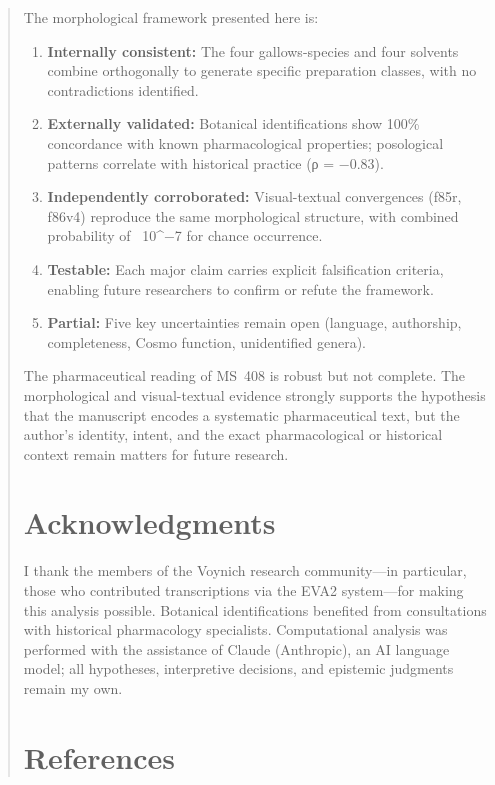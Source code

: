 \documentclass[11pt,a4paper]{article}
\begin{document}
\begin{abstract}
The morphological framework presented here is:

\begin{enumerate}
\item \textbf{Internally consistent:} The four gallows-species and four solvents combine orthogonally to generate specific preparation classes, with no contradictions identified.
  
\item \textbf{Externally validated:} Botanical identifications show 100\% concordance with known pharmacological properties; posological patterns correlate with historical practice (ρ = −0.83).
  
\item \textbf{Independently corroborated:} Visual-textual convergences (f85r, f86v4) reproduce the same morphological structure, with combined probability of ~10^{−7} for chance occurrence.
  
\item \textbf{Testable:} Each major claim carries explicit falsification criteria, enabling future researchers to confirm or refute the framework.
  
\item \textbf{Partial:} Five key uncertainties remain open (language, authorship, completeness, Cosmo function, unidentified genera).
\end{enumerate}

The pharmaceutical reading of MS~408 is robust but not complete. The morphological and visual-textual evidence strongly supports the hypothesis that the manuscript encodes a systematic pharmaceutical text, but the author's identity, intent, and the exact pharmacological or historical context remain matters for future research.

\section*{Acknowledgments}

I thank the members of the Voynich research community---in particular, those who contributed transcriptions via the EVA2 system---for making this analysis possible. Botanical identifications benefited from consultations with historical pharmacology specialists. Computational analysis was performed with the assistance of Claude (Anthropic), an AI language model; all hypotheses, interpretive decisions, and epistemic judgments remain my own.

\section*{References}


\end{abstract}
\end{document}
